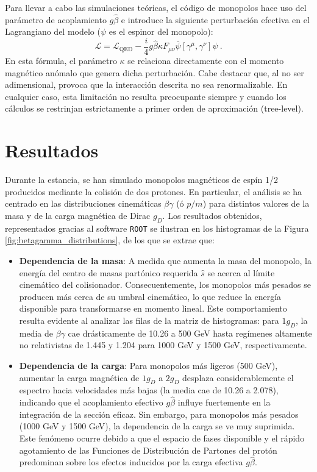 \documentclass[12pt, a4paper]{article}
\begin{document}
Para llevar a cabo las simulaciones teóricas, el código de monopolos hace uso del parámetro de acoplamiento $g\hat{\beta}$  e introduce la siguiente perturbación efectiva en el Lagrangiano del modelo ($\psi$ es el espinor del monopolo):
\begin{equation}
    \mathcal L=\mathcal L_{\text{QED}}-\frac{i}{4}g\hat\beta \kappa F_{\mu\nu}\bar\psi[\gamma^\mu,\gamma^\nu]\psi\ .
\end{equation}
En esta fórmula, el parámetro $\kappa$ se relaciona directamente con el momento magnético anómalo que genera dicha perturbación. Cabe destacar que, al no ser adimensional, provoca que la interacción descrita no sea renormalizable. En cualquier caso, esta limitación no resulta preocupante siempre y cuando los cálculos se restrinjan estrictamente a primer orden de aproximación (tree-level).

\section{Resultados}
Durante la estancia, se han simulado monopolos magnéticos de espín 1/2 producidos mediante la colisión de dos protones. En particular, el análisis se ha centrado en las distribuciones cinemáticas $\beta\gamma$ (ó $p/m$) para distintos valores de la masa y de la carga magnética de Dirac $g_D$. Los resultados obtenidos, representados gracias al software \texttt{ROOT} se ilustran en los histogramas de la Figura \ref{fig:betagamma_distributions}, de los que se extrae que:
\begin{itemize}
    \item \textbf{Dependencia de la masa}: A medida que aumenta la masa del monopolo, la energía del centro de masas partónico requerida $\hat{s}$ se acerca al límite cinemático del colisionador. Consecuentemente, los monopolos más pesados se producen más cerca de su umbral cinemático, lo que reduce la energía disponible para transformarse en momento lineal. Este comportamiento resulta evidente al analizar las filas de la matriz de histogramas: para $1g_D$, la media de $\beta\gamma$ cae drásticamente de 10.26 a 500 GeV hasta regímenes altamente no relativistas de 1.445 y 1.204 para 1000 GeV y 1500 GeV, respectivamente.
    \item \textbf{Dependencia de la carga}: Para monopolos más ligeros (500 GeV), aumentar la carga magnética de $1g_D$ a $2g_D$ desplaza considerablemente el espectro hacia velocidades más bajas (la media cae de 10.26 a 2.078), indicando que el acoplamiento efectivo $g\hat\beta$ influye fuertemente en la integración de la sección eficaz. Sin embargo, para monopolos más pesados (1000 GeV y 1500 GeV), la dependencia de la carga se ve muy suprimida. Este fenómeno ocurre debido a que el espacio de fases disponible y el rápido agotamiento de las Funciones de Distribución de Partones del protón predominan sobre los efectos inducidos por la carga efectiva $g\hat{\beta}$. 
\end{itemize}
\end{document}
